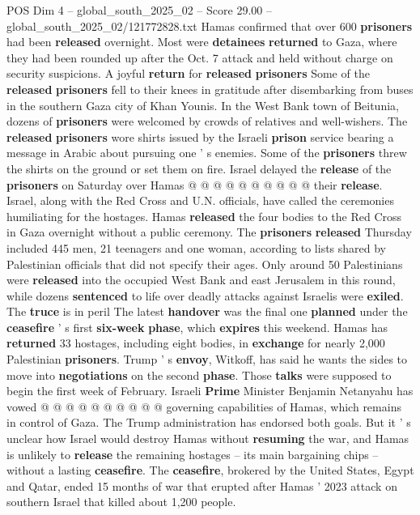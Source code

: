 \begin{textsample}{POS Dim 4 – global\_south\_2025\_02 – Score 29.00 – global\_south\_2025\_02/121772828.txt}
Hamas confirmed that over 600 \textbf{prisoners} had been \textbf{released} overnight.
Most were \textbf{detainees} \textbf{returned} to Gaza, where they had been rounded up after the Oct. 7 attack and held without charge on security suspicions.
A joyful \textbf{return} for \textbf{released} \textbf{prisoners} Some of the \textbf{released} \textbf{prisoners} fell to their knees in gratitude after disembarking from buses in the southern Gaza city of Khan Younis.
In the West Bank town of Beitunia, dozens of \textbf{prisoners} were welcomed by crowds of relatives and well-wishers.
The \textbf{released} \textbf{prisoners} wore shirts issued by the Israeli \textbf{prison} service bearing a message in Arabic about pursuing one ' s enemies.
Some of the \textbf{prisoners} threw the shirts on the ground or set them on fire.
Israel delayed the \textbf{release} of the \textbf{prisoners} on Saturday over Hamas @ @ @ @ @ @ @ @ @ @ their \textbf{release}.
Israel, along with the Red Cross and U.N. officials, have called the ceremonies humiliating for the hostages.
Hamas \textbf{released} the four bodies to the Red Cross in Gaza overnight without a public ceremony.
The \textbf{prisoners} \textbf{released} Thursday included 445 men, 21 teenagers and one woman, according to lists shared by Palestinian officials that did not specify their ages.
Only around 50 Palestinians were \textbf{released} into the occupied West Bank and east Jerusalem in this round, while dozens \textbf{sentenced} to life over deadly attacks against Israelis were \textbf{exiled}.
The \textbf{truce} is in peril The latest \textbf{handover} was the final one \textbf{planned} under the \textbf{ceasefire} ' s first \textbf{six-week} \textbf{phase}, which \textbf{expires} this weekend.
Hamas has \textbf{returned} 33 hostages, including eight bodies, in \textbf{exchange} for nearly 2,000 Palestinian \textbf{prisoners}.
Trump ' s \textbf{envoy}, Witkoff, has said he wants the sides to move into \textbf{negotiations} on the second \textbf{phase}.
Those \textbf{talks} were supposed to begin the first week of February.
Israeli \textbf{Prime} Minister Benjamin Netanyahu has vowed @ @ @ @ @ @ @ @ @ @ governing capabilities of Hamas, which remains in control of Gaza.
The Trump administration has endorsed both goals.
But it ' s unclear how Israel would destroy Hamas without \textbf{resuming} the war, and Hamas is unlikely to \textbf{release} the remaining hostages -- its main bargaining chips -- without a lasting \textbf{ceasefire}.
The \textbf{ceasefire}, brokered by the United States, Egypt and Qatar, ended 15 months of war that erupted after Hamas ' 2023 attack on southern Israel that killed about 1,200 people.

\end{textsample}
